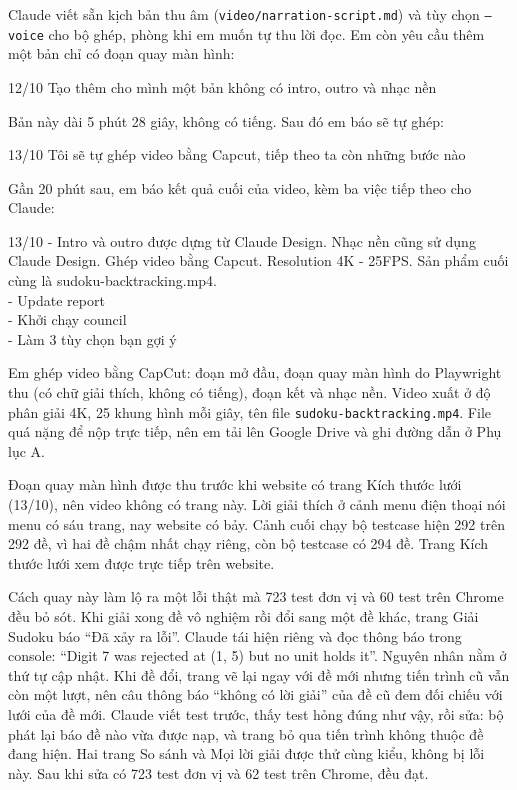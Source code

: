 Claude viết sẵn kịch bản thu âm (\texttt{video/narration-script.md}) và tùy chọn \texttt{--voice} cho bộ ghép, phòng khi em muốn tự thu lời đọc. Em còn yêu cầu thêm một bản chỉ có đoạn quay màn hình:

\begin{promptbox}{12/10}
Tạo thêm cho mình một bản không có intro, outro và nhạc nền
\end{promptbox}

Bản này dài 5 phút 28 giây, không có tiếng. Sau đó em báo sẽ tự ghép:

\begin{promptbox}{13/10}
Tôi sẽ tự ghép video bằng Capcut, tiếp theo ta còn những bước nào
\end{promptbox}

Gần 20 phút sau, em báo kết quả cuối của video, kèm ba việc tiếp theo cho Claude:

\begin{promptbox}{13/10}
- Intro và outro được dựng từ Claude Design. Nhạc nền cũng sử dụng Claude Design. Ghép video bằng Capcut. Resolution 4K - 25FPS. Sản phẩm cuối cùng là sudoku-backtracking.mp4.\\
- Update report\\
- Khởi chạy council\\
- Làm 3 tùy chọn bạn gợi ý
\end{promptbox}

Em ghép video bằng CapCut: đoạn mở đầu, đoạn quay màn hình do Playwright thu (có chữ giải thích, không có tiếng), đoạn kết và nhạc nền. Video xuất ở độ phân giải 4K, 25 khung hình mỗi giây, tên file \texttt{sudoku-backtracking.mp4}. File quá nặng để nộp trực tiếp, nên em tải lên Google Drive và ghi đường dẫn ở Phụ lục A.

Đoạn quay màn hình được thu trước khi website có trang Kích thước lưới (13/10), nên video không có trang này. Lời giải thích ở cảnh menu điện thoại nói menu có sáu trang, nay website có bảy. Cảnh cuối chạy bộ testcase hiện 292 trên 292 đề, vì hai đề chậm nhất chạy riêng, còn bộ testcase có 294 đề. Trang Kích thước lưới xem được trực tiếp trên website.

Cách quay này làm lộ ra một lỗi thật mà 723 test đơn vị và 60 test trên Chrome đều bỏ sót. Khi giải xong đề vô nghiệm rồi đổi sang một đề khác, trang Giải Sudoku báo ``Đã xảy ra lỗi''. Claude tái hiện riêng và đọc thông báo trong console: ``Digit 7 was rejected at (1, 5) but no unit holds it''. Nguyên nhân nằm ở thứ tự cập nhật. Khi đề đổi, trang vẽ lại ngay với đề mới nhưng tiến trình cũ vẫn còn một lượt, nên câu thông báo ``không có lời giải'' của đề cũ đem đối chiếu với lưới của đề mới. Claude viết test trước, thấy test hỏng đúng như vậy, rồi sửa: bộ phát lại báo đề nào vừa được nạp, và trang bỏ qua tiến trình không thuộc đề đang hiện. Hai trang So sánh và Mọi lời giải được thử cùng kiểu, không bị lỗi này. Sau khi sửa có 723 test đơn vị và 62 test trên Chrome, đều đạt.

